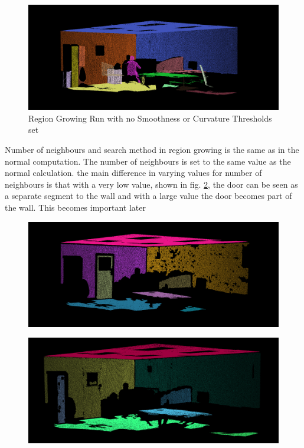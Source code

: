 		
		\begin{figure}[H]
			\centering
			\includegraphics[width=1\linewidth]{Includes/images/RegionGrowing/NoSmoothCurv}
			\caption{Region Growing Run with no Smoothness or Curvature Thresholds set}
			\label{fig:NoSmoothCurv}
		\end{figure}
	
		Number of neighbours and search method in region growing is the same as in the normal computation. The number of neighbours is set to the same value as the normal calculation. the main difference in varying values for number of neighbours is that with a very low value, shown in fig. \ref{fig:neighbours-5}, the door can be seen as a separate segment to the wall and with a large value the door becomes part of the wall. This becomes important later 
		
		
		\begin{figure}[H]
			\centering
			\includegraphics[width=1\linewidth]{Includes/images/RegionGrowing/neighbours-5}
			\caption{}
			\label{fig:neighbours-5}
		\end{figure}
		
		\begin{figure}[H]
			\centering
			\includegraphics[width=1\linewidth]{Includes/images/RegionGrowing/neighbours-200}
			\caption{}
			\label{fig:neighbours-200}
		\end{figure}

